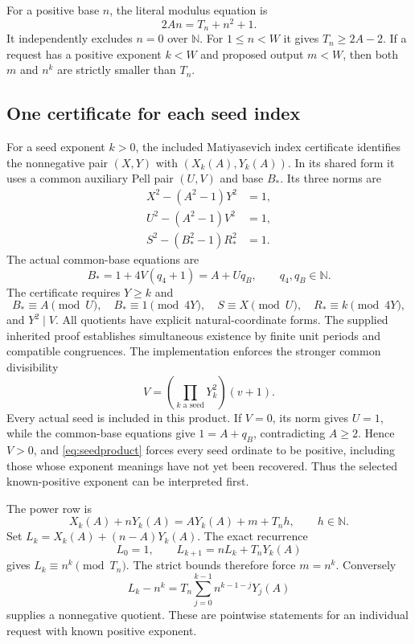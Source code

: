 \documentclass[11pt]{article}
\theoremstyle{definition}\newtheorem{definition}[theorem]{Definition}
\newcommand{\N}{\mathbb N}\newcommand{\Z}{\mathbb Z}\newcommand{\Q}{\mathbb Q}
\begin{document}
For a positive base $n$, the literal modulus equation is
\[
 2An=T_n+n^2+1.
\]
It independently excludes $n=0$ over $\N$. For $1\le n<W$ it gives
$T_n\ge2A-2$. If a request has a positive exponent $k<W$ and proposed
output $m<W$, then both $m$ and $n^k$ are strictly smaller than $T_n$.

\subsection{One certificate for each seed index}
For a seed exponent $k>0$, the included Matiyasevich index certificate
identifies the nonnegative pair $(X,Y)$ with $(X_k(A),Y_k(A))$.
In its shared form it uses a common auxiliary Pell pair $(U,V)$ and base
$B_*$. Its three norms are
\begin{align*}
 X^2-(A^2-1)Y^2&=1,\\
 U^2-(A^2-1)V^2&=1,\\
 S^2-(B_*^2-1)R_*^2&=1.
\end{align*}
The actual common-base equations are
\[
 B_*=1+4V(q_4+1)=A+Uq_B,\qquad q_4,q_B\in\N.
\]
The certificate requires $Y\ge k$ and
\[
 B_*\equiv A\pmod U,\quad B_*\equiv1\pmod{4Y},\quad
 S\equiv X\pmod U,\quad R_*\equiv k\pmod{4Y},
\]
and $Y^2\mid V$. All quotients have explicit natural-coordinate forms.
The supplied inherited proof establishes simultaneous existence by finite
unit periods and compatible congruences. The implementation enforces the
stronger common divisibility
\begin{equation}\label{eq:seedproduct}
 V=\left(\prod_{k\text{ a seed}}Y_k^2\right)(v+1).
\end{equation}
Every actual seed is included in this product.
If $V=0$, its norm gives $U=1$, while the common-base equations give
$1=A+q_B$, contradicting $A\ge2$. Hence $V>0$, and
\eqref{eq:seedproduct} forces every seed ordinate to be positive,
including those whose exponent meanings have not yet been recovered.
Thus the selected known-positive exponent can be interpreted first.

The power row is
\begin{equation}\label{eq:power}
 X_k(A)+nY_k(A)=AY_k(A)+m+T_n h,\qquad h\in\N.
\end{equation}
Set $L_k=X_k(A)+(n-A)Y_k(A)$. The exact recurrence
\[
 L_0=1,\qquad L_{k+1}=nL_k+T_nY_k(A)
\]
gives $L_k\equiv n^k\pmod{T_n}$. The strict bounds therefore force
$m=n^k$. Conversely
\[
 L_k-n^k=T_n\sum_{j=0}^{k-1}n^{k-1-j}Y_j(A)
\]
supplies a nonnegative quotient. These are pointwise statements for an
individual request with known positive exponent.
\end{document}
